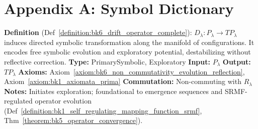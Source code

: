 \clearpage
{}
\chapter*{Appendix A: Symbol Dictionary}
\label{sec:appA_symbol_dictionary}

\begin{description}[leftmargin=2.5cm, style=nextline]

\item[\textbf{Symbolic Drift Operator} \hfill \( D_{\lambda} \)] 
\label{dict:appA_symbolic_drift_operator}
\textbf{Definition} (Def~\ref{definition:bk6_drift_operator_complete}): \( D_{\lambda} : P_\lambda \rightarrow T P_\lambda \) induces directed symbolic transformation along the manifold of configurations. It encodes free symbolic evolution and exploratory potential, destabilizing without reflective correction.
\textbf{Type:} PrimarySymbolic, Exploratory
\textbf{Input:} \( P_\lambda \)
\textbf{Output:} \( T P_\lambda \)
\textbf{Axioms:} Axiom~\ref{axiom:bk6_non_commutativity_evolution_reflection}, Axiom~\ref{axiom:bk1_axiomata_prima}
\textbf{Commutation:} Non-commuting with \( R_{\lambda} \)
\textbf{Notes:} Initiates exploration; foundational to emergence sequences and SRMF-regulated operator evolution (Def~\ref{definition:bk1_self_regulating_mapping_function_srmf}, Thm~\ref{theorem:bk5_operator_convergence}).


\end{description}
